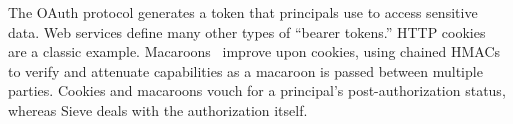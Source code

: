 The OAuth protocol generates a token
that principals use to access sensitive
data. Web services define many other types
of ``bearer tokens.'' HTTP cookies~\cite{cookies}
are a classic example. Macaroons~\cite{macaroons}
improve upon cookies, using chained HMACs
to verify and attenuate capabilities as a
macaroon is passed between multiple parties.
Cookies and macaroons vouch for a principal's
post-authorization status, whereas Sieve
deals with the authorization itself.
